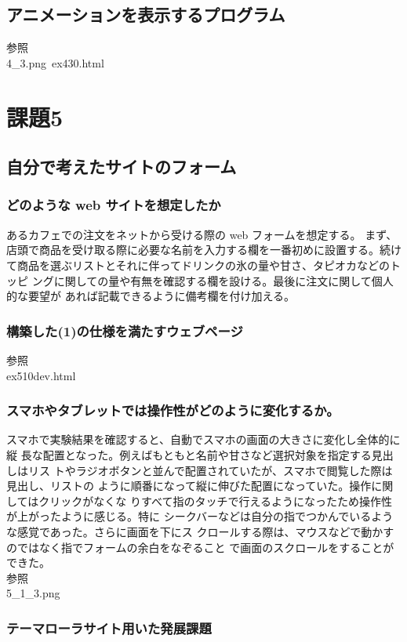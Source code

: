 \documentclass[a4j]{jarticle}
\begin{document}
    \subsection{アニメーションを表示するプログラム}
      参照\\
      4\_3.png\
      ex430.html
  \section{課題5}
    \subsection{自分で考えたサイトのフォーム}
      \subsubsection{どのような web サイトを想定したか}
        あるカフェでの注文をネットから受ける際の web フォームを想定する。
        まず、店頭で商品を受け取る際に必要な名前を入力する欄を一番初めに設置する。続け
        て商品を選ぶリストとそれに伴ってドリンクの氷の量や甘さ、タピオカなどのトッピ
        ングに関しての量や有無を確認する欄を設ける。最後に注文に関して個人的な要望が
        あれば記載できるように備考欄を付け加える。
      \subsubsection{構築した(1)の仕様を満たすウェブページ}
        参照\\
        ex510dev.html
      \subsubsection{スマホやタブレットでは操作性がどのように変化するか。}
        スマホで実験結果を確認すると、自動でスマホの画面の大きさに変化し全体的に縦
        長な配置となった。例えばもともと名前や甘さなど選択対象を指定する見出しはリス
        トやラジオボタンと並んで配置されていたが、スマホで閲覧した際は見出し、リストの
        ように順番になって縦に伸びた配置になっていた。操作に関してはクリックがなくな
        りすべて指のタッチで行えるようになったため操作性が上がったように感じる。特に
        シークバーなどは自分の指でつかんでいるような感覚であった。さらに画面を下にス
        クロールする際は、マウスなどで動かすのではなく指でフォームの余白をなぞること
        で画面のスクロールをすることができた。\\
        参照\\
        5\_1\_3.png
      \subsubsection{テーマローラサイト用いた発展課題}
\end{document}
